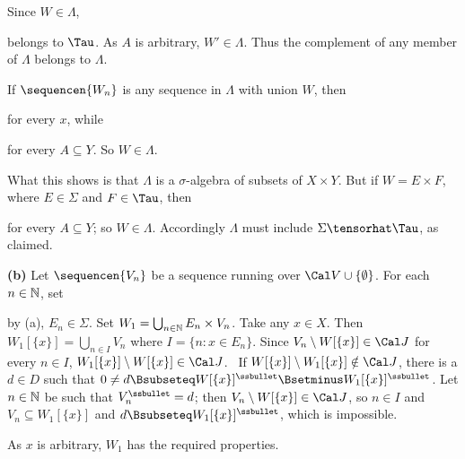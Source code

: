 {Since $W\in\Lambda$,


\noindent belongs to $\Tau$.   As $A$ is arbitrary,
$W'\in\Lambda$.   Thus the complement of any member of $\Lambda$ belongs
to $\Lambda$.

\medskip

 If $\sequencen{W_n}$ is any sequence in $\Lambda$ with
union $W$, then


\noindent for every $x$, while


\noindent for every $A\subseteq Y$.   So $W\in\Lambda$.

\medskip

 What this shows is that $\Lambda$ is a $\sigma$-algebra
of
subsets of $X\times Y$.   But if $W=E\times F$, where $E\in\Sigma$ and
$F\in\Tau$, then



\noindent for every $A\subseteq Y$;  so $W\in\Lambda$.   Accordingly
$\Lambda$ must include $\Sigma\tensorhat\Tau$, as
claimed.

\medskip

{\bf (b)} Let $\sequencen{V_n}$ be a sequence running over
$\Cal V\cup\{\emptyset\}$.   For each $n\in\Bbb N$, set


\noindent by (a), $E_n\in\Sigma$.   Set
$W_1=\bigcup_{n\in\Bbb N}E_n\times V_n$.   Take any $x\in X$.
Then $W_1[\{x\}]=\bigcup_{n\in I}V_n$ where $I=\{n:x\in E_n\}$.
Since $V_n\setminus W[\{x\}]\in\Cal J$ for every $n\in I$,
$W_1[\{x\}]\setminus W[\{x\}]\in\Cal J$.   \Quer\ If
$W[\{x\}]\setminus W_1[\{x\}]\notin\Cal J$, there is a
$d\in D$ such that
$0\ne d\Bsubseteq W[\{x\}]^{\ssbullet}\Bsetminus W_1[\{x\}]^{\ssbullet}$.   Let $n\in\Bbb N$ be such that
$V_n^{\ssbullet}=d$;  then $V_n\setminus W[\{x\}]\in\Cal J$, so $n\in I$
and $V_n\subseteq W_1[\{x\}]$ and $d\Bsubseteq W_1[\{x\}]^{\ssbullet}$,
which is impossible.\ \Bang

As $x$ is arbitrary, $W_1$ has the required properties.
}%


